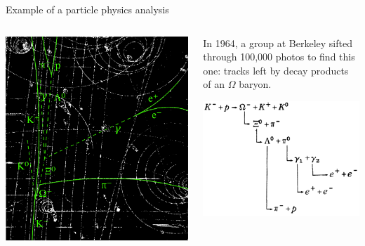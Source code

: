 \documentclass[aspectratio=169]{beamer}
\begin{document}
\begin{frame}{Example of a particle physics analysis}
\large
\begin{columns}
\vspace{0.3 cm}
\includegraphics[width=\linewidth]{img/omega-minus-2.png}

\begin{center}
In 1964, a group at Berkeley sifted through 100,000 photos to find this one: tracks left by decay products of an $\Omega$ baryon.

\vspace{0.25 cm}
\includegraphics[width=\linewidth]{img/decay-chain.png}
\end{center}

\end{columns}
\end{frame}
\end{document}
